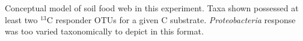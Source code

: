 Conceptual model of soil food web in this experiment. Taxa shown possessed at least two $^{13}$C responder OTUs for a given C substrate. \textit{Proteobacteria} response was too varied taxonomically to depict in this format.